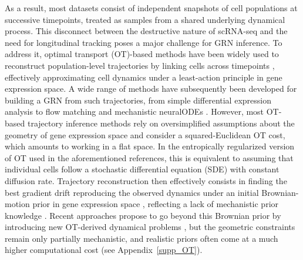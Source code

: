 \documentclass[a4paper, 11pt]{article}
\theoremstyle{plain}
\theoremstyle{remark}
\begin{document}
As a result, most datasets consist of independent snapshots of cell populations at successive timepoints, treated as samples from a shared underlying dynamical process. This disconnect between the destructive nature of scRNA-seq and the need for longitudinal tracking poses a major challenge for GRN inference. To address it, optimal transport (OT)-based methods \cite{santambrogio2015optimal} have been widely used to reconstruct population-level trajectories by linking cells across timepoints \cite{schiebinger2019optimal, lavenant2021towards, qiu2022mapping}, effectively approximating cell dynamics under a least-action principle in gene expression space. A wide range of methods have subsequently been developed for building a GRN from such trajectories, from simple differential expression analysis \cite{massri2021developmental} to flow matching \cite{tong2023simulation, rimawi2025simulation} and mechanistic neuralODEs \cite{bertin2025scalable}. However, most OT-based trajectory inference methods rely on oversimplified assumptions about the geometry of gene expression space and consider a squared-Euclidean OT cost, which amounts to working in a flat space. In the entropically regularized version of OT used in the aforementioned references, this is equivalent to assuming that individual cells follow a stochastic differential equation (SDE) with constant diffusion rate. Trajectory reconstruction then effectively consists in finding the best gradient drift reproducing the observed dynamics under an initial Brownian-motion prior in gene expression space \cite{leonard2012schrodinger}, reflecting a lack of mechanistic prior knowledge \cite{fournie2025cell}. Recent approaches propose to go beyond this Brownian prior by introducing new OT-derived dynamical problems \cite{neklyudov2023computational, zhang2024joint, lamoline2025dynamic, guan2024identifying}, but the geometric constraints remain only partially mechanistic, and realistic priors often come at a much higher computational cost (see Appendix~\ref{supp_OT}).
\end{document}
